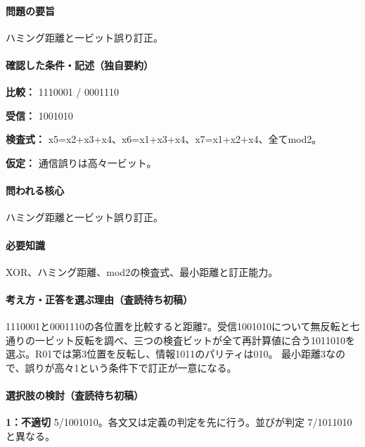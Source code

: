 \paragraph{問題の要旨} ハミング距離と一ビット誤り訂正。

\paragraph{確認した条件・記述（独自要約）}\mbox{}\par

\noindent\textbf{比較：} 1110001 / 0001110\par

\noindent\textbf{受信：} 1001010\par

\noindent\textbf{検査式：} x5=\allowbreak{}x2+x3+x4、x6=\allowbreak{}x1+x3+x4、x7=\allowbreak{}x1+x2+x4、全てmod2。\par

\noindent\textbf{仮定：} 通信誤りは高々一ビット。\par

\paragraph{問われる核心} ハミング距離と一ビット誤り訂正。

\paragraph{必要知識} XOR、ハミング距離、mod2の検査式、最小距離と訂正能力。

\paragraph{考え方・正答を選ぶ理由（査読待ち初稿）} 1110001と0001110の各位置を比較すると距離7。受信1001010について無反転と七通りの一ビット反転を調べ、三つの検査ビットが全て再計算値に合う1011010を選ぶ。R01では第3位置を反転し、情報1011のパリティは010。 最小距離3なので、誤りが高々1という条件下で訂正が一意になる。

\paragraph{選択肢の検討（査読待ち初稿）}\mbox{}\par

\noindent\textbf{1：不適切} 5/1001010。各文又は定義の判定を先に行う。並びが判定 7/1011010 と異なる。\par

